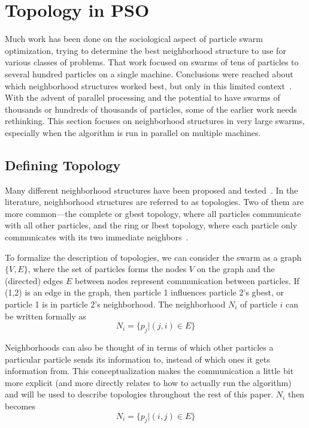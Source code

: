 \documentclass[onecolumn, 12pt]{article}
\begin{document}
\section{Topology in PSO}
\label{sec:topology}

Much work has been done on the sociological aspect of particle swarm
optimization, trying to determine the best neighborhood structure to use for
various classes of problems.  That work focused on swarms of tens of particles
to several hundred particles on a single machine.  Conclusions were reached
about which neighborhood structures worked best, but only in this limited
context~\cite{bratton-sis07}.  With the advent of parallel processing and the
potential to have swarms of thousands or hundreds of thousands of particles,
some of the earlier work needs rethinking.  This section focuses on
neighborhood structures in very large swarms, especially when the algorithm is
run in parallel on multiple machines.  

\subsection{Defining Topology}

Many different neighborhood structures have been proposed and
tested~\cite{kennedy-cec02}.  In the literature, neighborhood structures are
referred to as topologies.  Two of them are more common---the complete or gbest
topology, where all particles communicate with all other particles, and the
ring or lbest topology, where each particle only communicates with its two
immediate neighbors~\cite{bratton-sis07}.  

To formalize the description of topologies, we can consider the swarm as a
graph $\{V,E\}$, where the set of particles forms the nodes $V$ on the graph
and the (directed) edges $E$ between nodes represent communication between
particles.  If (1,2) is an edge in the graph, then particle 1 influences
particle 2's gbest, or particle 1 is in particle 2's neighborhood.  The
neighborhood $N_i$ of particle $i$ can be written formally as 
\[N_i = \{p_j|(j,i)\in E\}\]

Neighborhoods can also be thought of in terms of which other particles a
particular particle sends its information to, instead of which ones it gets
information from.  This conceptualization makes the communication a little bit
more explicit (and more directly relates to how to actually run the algorithm)
and will be used to describe topologies throughout the rest of this paper.
$N_i$ then becomes
\[N_i = \{p_j|(i,j)\in E\}\]
\end{document}
